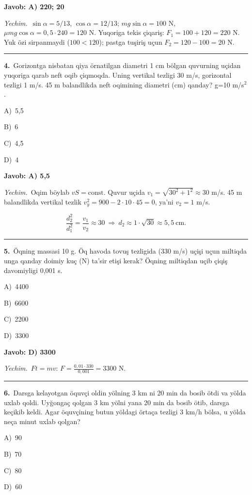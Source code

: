 \documentclass[11pt,a4paper]{article}
\newcommand{\opt}[2]{\hspace*{4mm}#1)\ #2\par}
\begin{document}
\noindent\colorbox{gray!12}{\parbox{\dimexpr\linewidth-2\fboxsep}{\textbf{Javob: A) 220; 20}}}\par\smallskip
\noindent\textit{Yechim.}\ $\sin\alpha=5/13$, $\cos\alpha=12/13$; $mg\sin\alpha=100$ N, $\mu mg\cos\alpha=0{,}5\cdot240=120$ N. Yuqoriga tekis çiqariş: $F_1=100+120=220$ N. Yuk özi sirpanmaydi ($100<120$); pastga tuşiriş uçun $F_2=120-100=20$ N.\par\par\medskip\hrule\medskip
{}\noindent\begin{minipage}{\linewidth}
\textbf{4.}\ Gorizontga nisbatan qiya örnatilgan diametri 1 cm bölgan quvurning uçidan yuqoriga qarab neft oqib çiqmoqda. Uning vertikal tezligi 30 m/s, gorizontal tezligi 1 m/s. 45 m balandlikda neft oqimining diametri (cm) qanday? g=10 m/s$^{2}$.\par\smallskip
\opt{A}{5,5}
\opt{B}{6}
\opt{C}{4,5}
\opt{D}{4}
\end{minipage}\vspace{2pt}\par
\noindent\colorbox{gray!12}{\parbox{\dimexpr\linewidth-2\fboxsep}{\textbf{Javob: A) 5,5}}}\par\smallskip
\noindent\textit{Yechim.}\ Oqim böylab $vS=\text{const}$. Quvur uçida $v_1=\sqrt{30^2+1^2}\approx30$ m/s. 45 m balandlikda vertikal tezlik $v_y^2=900-2\cdot10\cdot45=0$, ya’ni $v_2=1$ m/s.\par
\[\frac{d_2^2}{d_1^2}=\frac{v_1}{v_2}\approx30\ \Rightarrow\ d_2\approx1\cdot\sqrt{30}\approx5{,}5\ \text{cm}.\]\par\medskip\hrule\medskip
{}\noindent\begin{minipage}{\linewidth}
\textbf{5.}\ Öqning massasi 10 g. Öq havoda tovuş tezligida (330 m/s) uçişi uçun miltiqda unga qanday doimiy kuç (N) ta’sir etişi kerak? Öqning miltiqdan uçib çiqiş davomiyligi 0,001 s.\par\smallskip
\opt{A}{4400}
\opt{B}{6600}
\opt{C}{2200}
\opt{D}{3300}
\end{minipage}\vspace{2pt}\par
\noindent\colorbox{gray!12}{\parbox{\dimexpr\linewidth-2\fboxsep}{\textbf{Javob: D) 3300}}}\par\smallskip
\noindent\textit{Yechim.}\ $Ft=mv$: $F=\frac{0{,}01\cdot330}{0{,}001}=3300$ N.\par\par\medskip\hrule\medskip
{}\noindent\begin{minipage}{\linewidth}
\textbf{6.}\ Darsga kelayotgan öquvçi oldin yölning 3 km ni 20 min da bosib ötdi va yölda uxlab qoldi. Uyğongaç qolgan 3 km yölni yana 20 min da bosib ötib, darsga keçikib keldi. Agar öquvçining butun yöldagi örtaça tezligi 3 km/h bölsa, u yölda neça minut uxlab qolgan?\par\smallskip
\opt{A}{90}
\opt{B}{70}
\opt{C}{80}
\opt{D}{60}
\end{minipage}\vspace{2pt}\par
\end{document}
